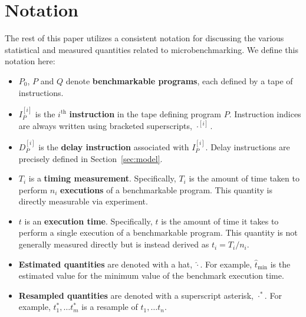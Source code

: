 \documentclass[conference]{IEEEtran}
\begin{document}

\label{sec:notation}
\section{Notation}

The rest of this paper utilizes a consistent notation for discussing the various statistical
and measured quantities related to microbenchmarking. We define this notation here:

\begin{itemize}
    \item
    $P_0$, $P$ and $Q$ denote \textbf{benchmarkable programs}, each defined by a tape of
    instructions.

    \item
    $I^{[i]}_{P}$ is the $i^{\textrm{th}}$ \textbf{instruction} in the tape defining program $P$.
    Instruction indices are always written using bracketed superscripts, $\cdot^{[i]}$.

    \item
    $D^{[i]}_{P}$ is the \textbf{delay instruction} associated with $I^{[i]}_{P}$. Delay
    instructions are precisely defined in Section~\ref{sec:model}.

    \item
    $T_i$ is a \textbf{timing measurement}. Specifically, $T_i$ is the amount of time taken
    to perform $n_i$ \textbf{executions} of a benchmarkable program. This quantity is
    directly measurable via experiment.

    \item
    $t$ is an \textbf{execution time}. Specifically, $t$ is the amount of time it takes to
    perform a single execution of a benchmarkable program. This quantity is not generally
    measured directly but is instead derived as $t_i = T_i / n_i$.

    \item
    \textbf{Estimated quantities} are denoted with a hat, $\hat\cdot$. For example,
    $\hat{t}_{\textrm{min}}$ is the estimated value for the minimum value of the benchmark execution
    time.

    \item
    \textbf{Resampled quantities} are denoted with a superscript asterisk, $\cdot^*$. For
    example, $t^*_1, \dots t^*_m$ is a resample of $t_1, \dots t_n$.


\end{itemize}
\end{document}
